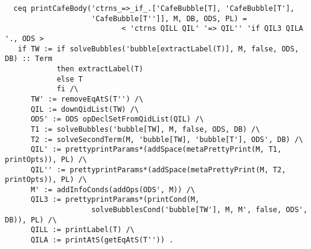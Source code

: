 {\codesize
\begin{verbatim}
  ceq printCafeBody('ctrns_=>_if_.['CafeBubble[T], 'CafeBubble[T'],
                    'CafeBubble[T'']], M, DB, ODS, PL) =
                           < 'ctrns QILL QIL' '=> QIL'' 'if QIL3 QILA '., ODS >
   if TW := if solveBubbles('bubble[extractLabel(T)], M, false, ODS, DB) :: Term
            then extractLabel(T)
            else T
            fi /\
      TW' := removeEqAtS(T'') /\
      QIL := downQidList(TW) /\
      ODS' := ODS opDeclSetFromQidList(QIL) /\
      T1 := solveBubbles('bubble[TW], M, false, ODS, DB) /\
      T2 := solveSecondTerm(M, 'bubble[TW], 'bubble[T'], ODS', DB) /\
      QIL' := prettyprintParams*(addSpace(metaPrettyPrint(M, T1, printOpts)), PL) /\
      QIL'' := prettyprintParams*(addSpace(metaPrettyPrint(M, T2, printOpts)), PL) /\
      M' := addInfoConds(addOps(ODS', M)) /\
      QIL3 := prettyprintParams*(printCond(M,
                    solveBubblesCond('bubble[TW'], M, M', false, ODS', DB)), PL) /\
      QILL := printLabel(T) /\
      QILA := printAtS(getEqAtS(T'')) .
\end{verbatim}
}


